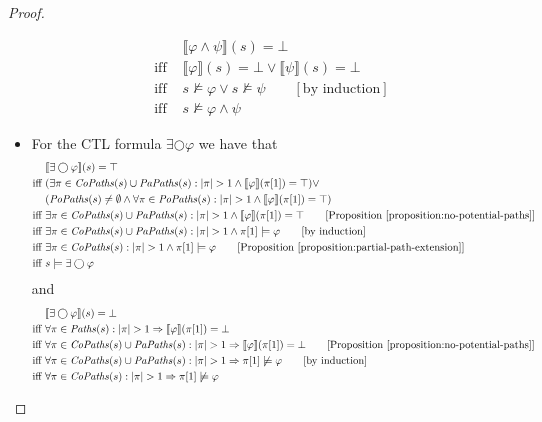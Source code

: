 \documentclass[12pt]{article}
\newcommand{\nxt}{\bigcirc}
\theoremstyle{definition}
\newcommand{\comment}[1]{\hspace{2em}[\mbox{#1}]}
\newcommand{\satisfaction}[1]{\llbracket #1 \rrbracket}
\newcommand{\bottom}{\mathord{\perp}}
\begin{document}
\begin{proof}
\begin{itemize}
\begin{align*}
& \satisfaction{\varphi \wedge \psi}(s) = \bottom\\
\mbox{iff } & \satisfaction{\varphi}(s) = \bottom \vee \satisfaction{\psi}(s) = \bottom\\
\mbox{iff } & s \not\models \varphi \vee s \not\models \psi
\comment{by induction}\\
\mbox{iff } & s \not\models \varphi \wedge \psi
\end{align*}
\item
For the CTL formula $\exists \nxt \varphi$ we have that
\begin{align*}
& \satisfaction{\exists \nxt \varphi}(s) = \top\\
\mbox{iff } & (\exists \pi \in \mathit{CoPaths}(s) \cup \mathit{PaPaths}(s) : |\pi| > 1 \wedge \satisfaction{\varphi}(\pi[1]) = \top) \vee\\
& (\mathit{PoPaths}(s) \not= \emptyset \wedge \forall \pi \in \mathit{PoPaths}(s) : |\pi| > 1 \wedge \satisfaction{\varphi}(\pi[1]) = \top)\\
\mbox{iff } & \exists \pi \in \mathit{CoPaths}(s) \cup \mathit{PaPaths}(s) : |\pi| > 1 \wedge \satisfaction{\varphi}(\pi[1]) = \top
\comment{Proposition~\ref{proposition:no-potential-paths}}\\
\mbox{iff } & \exists \pi \in \mathit{CoPaths}(s) \cup \mathit{PaPaths}(s) : |\pi| > 1 \wedge \pi[1] \models \varphi
\comment{by induction}\\
\mbox{iff } & \exists \pi \in \mathit{CoPaths}(s) : |\pi| > 1 \wedge \pi[1] \models \varphi
\comment{Proposition~\ref{proposition:partial-path-extension}}\\
\mbox{iff } & s \models \exists \nxt \varphi
\end{align*}
and
\begin{align*}
& \satisfaction{\exists \nxt \varphi}(s) = \bottom\\
\mbox{iff } & \forall \pi \in \mathit{Paths}(s) : |\pi| > 1 \Rightarrow \satisfaction{\varphi}(\pi[1]) = \bottom\\
\mbox{iff } & \forall \pi \in \mathit{CoPaths}(s) \cup \mathit{PaPaths}(s) : |\pi| > 1 \Rightarrow \satisfaction{\varphi}(\pi[1]) = \bottom
\comment{Proposition~\ref{proposition:no-potential-paths}}\\
\mbox{iff } & \forall \pi \in \mathit{CoPaths}(s) \cup \mathit{PaPaths}(s) : |\pi| > 1 \Rightarrow \pi[1] \not\models \varphi
\comment{by induction}\\
\mbox{iff } & \forall \pi \in \mathit{CoPaths}(s) : |\pi| > 1 \Rightarrow \pi[1] \not\models \varphi

\end{align*}
\end{itemize}
\end{proof}
\end{document}
